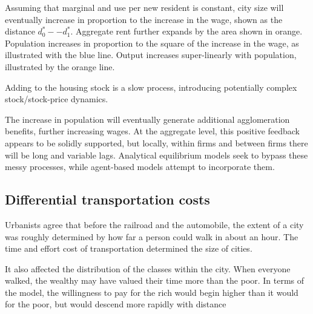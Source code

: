 Assuming that marginal and use per new resident is constant, city size will eventually increase in proportion to the increase in the wage, shown as the distance $d^*_0--d^*_1$. Aggregate rent  further expands by the area shown in orange. Population increases in proportion to the square of the increase in the wage, as illustrated with the blue line.  Output increases super-linearly with population, illustrated by the orange line. 

Adding to the  housing stock is a slow process, introducing potentially complex stock/stock-price dynamics.

The increase in population will eventually generate additional agglomeration benefits, further increasing wages. At the aggregate level, this positive feedback appears to be solidly supported, but locally, within firms and between firms there will be long and variable lags. Analytical equilibrium models seek to bypass these messy processes, while agent-based models attempt to incorporate them.

\subsection{Differential transportation costs}
 Urbanists agree that before the railroad and the automobile, the extent of a city was roughly determined by how far a person could walk in about an hour. The time and effort cost of transportation determined the size of cities. 
 
 It also affected the distribution of the classes within the city. When everyone walked, the  wealthy may have valued their time more than the poor. In terms of the model, the willingness to pay for the rich would begin higher than it would for the poor, but would descend more rapidly with distance

\begin{center}
\end{center}


